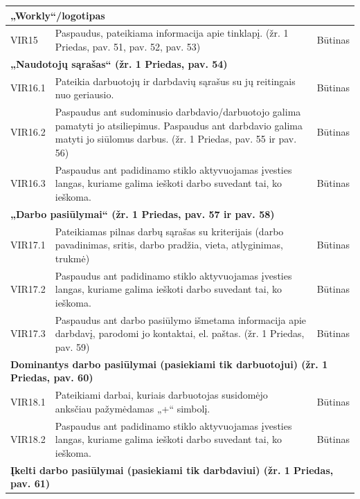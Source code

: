 \documentclass{VUMIFPSkursinis}
\begin{document}
\begin{table}[H]
\centering
\normalsize
\begin{tabular}{|p{2cm}|p{10cm}|p{3cm}|}
\hline
\multicolumn{3}{|l|}{\textbf{„Workly“/logotipas}} \\ \hline
VIR15 & \multicolumn{1}{m{10cm}|}{Paspaudus, pateikiama informacija apie tinklapį. (žr. 1 Priedas, pav. 51, pav. 52, pav. 53)} & Būtinas \\ \hline
\multicolumn{3}{|l|}{\textbf{„Naudotojų sąrašas“ (žr. 1 Priedas, pav. 54)}} \\ \hline
VIR16.1 & \multicolumn{1}{m{10cm}|}{Pateikia darbuotojų ir darbdavių sąrašus su jų reitingais nuo geriausio.} & Būtinas \\ \hline
VIR16.2 & \multicolumn{1}{m{10cm}|}{Paspaudus ant sudominusio darbdavio/darbuotojo galima pamatyti jo atsiliepimus. Paspaudus ant darbdavio galima matyti jo siūlomus darbus. (žr. 1 Priedas, pav. 55 ir pav. 56)} & Būtinas \\ \hline
VIR16.3 & \multicolumn{1}{m{10cm}|}{Paspaudus ant padidinamo stiklo aktyvuojamas įvesties langas, kuriame galima ieškoti darbo suvedant tai, ko ieškoma.} & Būtinas \\ \hline
\multicolumn{3}{|l|}{\textbf{„Darbo pasiūlymai“ (žr. 1 Priedas, pav. 57 ir pav. 58)}} \\ \hline
VIR17.1 & \multicolumn{1}{m{10cm}|}{Pateikiamas pilnas darbų sąrašas su kriterijais (darbo pavadinimas, sritis, darbo pradžia, vieta, atlyginimas, trukmė)} & Būtinas \\ \hline
VIR17.2 & \multicolumn{1}{m{10cm}|}{Paspaudus ant padidinamo stiklo aktyvuojamas įvesties langas, kuriame galima ieškoti darbo suvedant tai, ko ieškoma.} & Būtinas \\ \hline
VIR17.3 & \multicolumn{1}{m{10cm}|}{Paspaudus ant darbo pasiūlymo išmetama informacija apie darbdavį, parodomi jo kontaktai, el. paštas. (žr. 1 Priedas, pav. 59)} & Būtinas \\ \hline
\multicolumn{3}{|l|}{\textbf{Dominantys darbo pasiūlymai (pasiekiami tik  darbuotojui) (žr. 1 Priedas, pav. 60)}} \\ \hline
VIR18.1 & \multicolumn{1}{m{10cm}|}{Pateikiami darbai, kuriais darbuotojas susidomėjo anksčiau pažymėdamas „+“ simbolį.} & Būtinas \\ \hline
VIR18.2 & \multicolumn{1}{m{10cm}|}{Paspaudus ant padidinamo stiklo aktyvuojamas įvesties langas, kuriame galima ieškoti darbo suvedant tai, ko ieškoma.} & Būtinas \\ \hline
\multicolumn{3}{|l|}{\textbf{Įkelti darbo pasiūlymai (pasiekiami tik darbdaviui) (žr. 1 Priedas, pav. 61)}} \\ \hline

\end{tabular}
\end{table}
\end{document}
